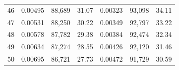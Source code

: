 \begin{tabular}{cccc|ccc}
46   & 0.00495                                                          & 88,689                                                                                            & 31.07                                                                                                                      & 0.00323                                                          & 93,098                                                                                            & 34.11                                                                                                                      \\
47   & 0.00531                                                          & 88,250                                                                                            & 30.22                                                                                                                      & 0.00349                                                          & 92,797                                                                                            & 33.22                                                                                                                      \\
48   & 0.00578                                                          & 87,782                                                                                            & 29.38                                                                                                                      & 0.00384                                                          & 92,474                                                                                            & 32.34                                                                                                                      \\
49   & 0.00634                                                          & 87,274                                                                                            & 28.55                                                                                                                      & 0.00426                                                          & 92,120                                                                                            & 31.46                                                                                                                      \\
50   & 0.00695                                                          & 86,721                                                                                            & 27.73                                                                                                                      & 0.00472                                                          & 91,729                                                                                            & 30.59                                                                                                                      \\
\bottomrule
\end{tabular}
